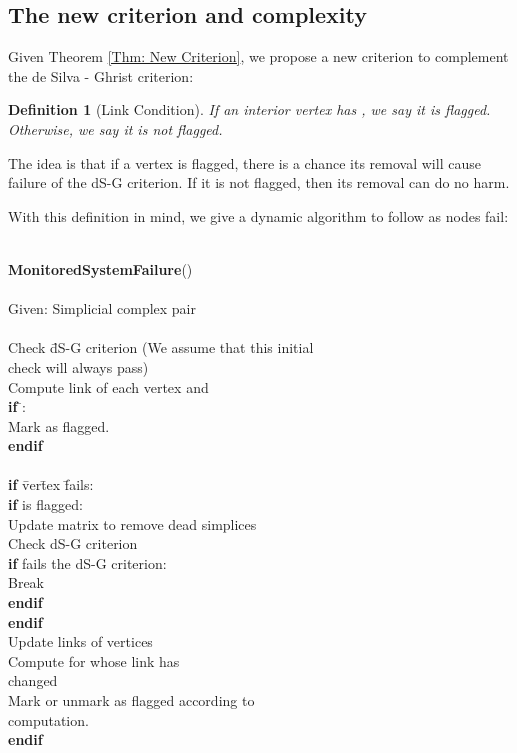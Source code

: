 \documentclass[10pt,twocolumn]{article} \usepackage{amsmath,epsf,amssymb,cite,pifont,amsthm, mathrsfs,epsfig,  bbm, amsthm,  setspace}
\newtheorem{defn}{Definition}
\renewcommand{\1}{\mathbbm{1}}
\begin{document}
\subsection{The new criterion and complexity}

Given Theorem \ref{Thm: New Criterion}, we propose a new criterion to complement the de Silva - Ghrist criterion:
\begin{defn}[Link Condition]
 If an interior vertex  has , we say it is flagged.  Otherwise, we say it is not flagged.
\end{defn}
The idea is that if a vertex is flagged, there is a chance its removal will cause failure of the dS-G criterion.  If it is not flagged, then its removal can do no harm.

With this definition in mind, we give a dynamic algorithm to follow as nodes fail:

\begin{tabbing}
\\
\textbf{MonitoredSystemFailure}()\\
\\
Given: Simplicial complex pair \\
\\
Check \= dS-G criterion 
 (We assume that this initial \\ \>check will always pass)\\
Compute link of each vertex  and \\
\textbf{if} \={}:\\
\>	Mark  as flagged.\\
\textbf{endif}\\
\\
\textbf{if} \=ver\=tex \= fails:\\
\>		\textbf{if} { is flagged}:\\
\>\>			Update matrix  to remove dead simplices\\
\>\>			Check dS-G criterion\\
\>\>			 \textbf{if}  fails the dS-G criterion:\\
\>\>\>				 Break\\
\>\>			\textbf{endif} \\
\>		\textbf{endif} \\
\>		Update links of vertices\\
\>		Compute  for  whose link has \\ \>\>changed\\
\>		Mark or unmark  as flagged according to  \\ \>\>computation.\\
\textbf{endif} \\		
\\
\end{tabbing}
\end{document}
